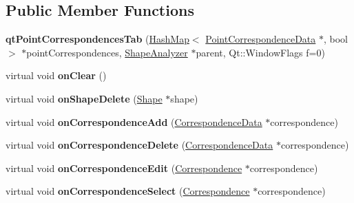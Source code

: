 \subsection*{Public Member Functions}
\begin{DoxyCompactItemize}
\item 
\hypertarget{classqt_point_correspondences_tab_a846ba4575f7b2acf1c4d6bf969a1058a}{}{\bfseries qt\+Point\+Correspondences\+Tab} (\hyperlink{class_hash_map}{Hash\+Map}$<$ \hyperlink{class_point_correspondence_data}{Point\+Correspondence\+Data} $\ast$, bool $>$ $\ast$point\+Correspondences, \hyperlink{class_shape_analyzer}{Shape\+Analyzer} $\ast$parent, Qt\+::\+Window\+Flags f=0)\label{classqt_point_correspondences_tab_a846ba4575f7b2acf1c4d6bf969a1058a}

\item 
\hypertarget{classqt_point_correspondences_tab_a7e07cc3dbe7981215885d5b9ddab14a8}{}virtual void {\bfseries on\+Clear} ()\label{classqt_point_correspondences_tab_a7e07cc3dbe7981215885d5b9ddab14a8}

\item 
\hypertarget{classqt_point_correspondences_tab_a3fd3d809d1686a5397befe85feeac399}{}virtual void {\bfseries on\+Shape\+Delete} (\hyperlink{class_shape}{Shape} $\ast$shape)\label{classqt_point_correspondences_tab_a3fd3d809d1686a5397befe85feeac399}

\item 
\hypertarget{classqt_point_correspondences_tab_abd778bdd1cac74a256c487e396c1b91c}{}virtual void {\bfseries on\+Correspondence\+Add} (\hyperlink{class_correspondence_data}{Correspondence\+Data} $\ast$correspondence)\label{classqt_point_correspondences_tab_abd778bdd1cac74a256c487e396c1b91c}

\item 
\hypertarget{classqt_point_correspondences_tab_a4cce7bd311c4d4076cdb62c77526b913}{}virtual void {\bfseries on\+Correspondence\+Delete} (\hyperlink{class_correspondence_data}{Correspondence\+Data} $\ast$correspondence)\label{classqt_point_correspondences_tab_a4cce7bd311c4d4076cdb62c77526b913}

\item 
\hypertarget{classqt_point_correspondences_tab_a31bacf4fea3333cbd8bcc1fc04e67d02}{}virtual void {\bfseries on\+Correspondence\+Edit} (\hyperlink{class_correspondence}{Correspondence} $\ast$correspondence)\label{classqt_point_correspondences_tab_a31bacf4fea3333cbd8bcc1fc04e67d02}

\item 
\hypertarget{classqt_point_correspondences_tab_a3cdbc161275ce825fcf5833b1c5ef2e1}{}virtual void {\bfseries on\+Correspondence\+Select} (\hyperlink{class_correspondence}{Correspondence} $\ast$correspondence)\label{classqt_point_correspondences_tab_a3cdbc161275ce825fcf5833b1c5ef2e1}


\end{DoxyCompactItemize}
